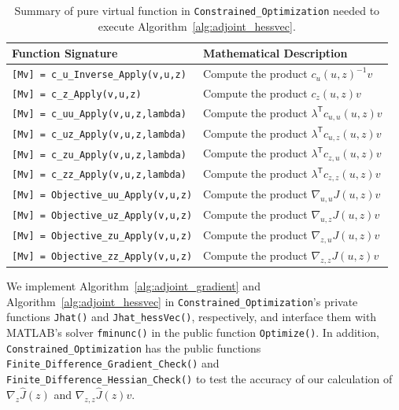 \documentclass{article}
\newcommand{\trp}{^{\mathsf{T}}}
\begin{document}
\begin{table}[!ht]
\centering
\begin{tabular}{|l|l|}
    \hline
    Function Signature & Mathematical Description
    \\ \hline
    \texttt{[Mv] = c\_u\_Inverse\_Apply(v,u,z)}
    & Compute the product $c_u(u,z)^{-1} v$
    \\
    \texttt{[Mv] = c\_z\_Apply(v,u,z)}
    & Compute the product $c_z(u,z) v$
    \\
    \texttt{[Mv] = c\_uu\_Apply(v,u,z,lambda)}
    & Compute the product $\lambda\trp c_{u,u}(u,z) v$
    \\
    \texttt{[Mv] = c\_uz\_Apply(v,u,z,lambda)}
    & Compute the product $\lambda\trp c_{u,z}(u,z) v$
    \\
    \texttt{[Mv] = c\_zu\_Apply(v,u,z,lambda)}
    & Compute the product $\lambda\trp c_{z,u}(u,z)v$
    \\
    \texttt{[Mv] = c\_zz\_Apply(v,u,z,lambda)}
    & Compute the product $\lambda\trp c_{z,z}(u,z) v$
    \\
    \texttt{[Mv] = Objective\_uu\_Apply(v,u,z)}
    & Compute the product $\nabla_{u,u} J(u,z) v$
    \\
    \texttt{[Mv] = Objective\_uz\_Apply(v,u,z)}
    & Compute the product $\nabla_{u,z} J(u,z) v$
    \\
    \texttt{[Mv] = Objective\_zu\_Apply(v,u,z)}
    & Compute the product $\nabla_{z,u} J(u,z) v$
    \\
    \texttt{[Mv] = Objective\_zz\_Apply(v,u,z)}
    & Compute the product $\nabla_{z,z} J(u,z) v$
    \\ \hline
\end{tabular}
\caption{Summary of pure virtual function in \texttt{Constrained\_Optimization} needed to execute Algorithm~\ref{alg:adjoint_hessvec}.}
\label{tab:con_opt_pure_virtual_funs_2}
\end{table}

We implement Algorithm~\ref{alg:adjoint_gradient} and Algorithm~\ref{alg:adjoint_hessvec} in \texttt{Constrained\_Optimization}'s private functions \texttt{Jhat()} and \texttt{Jhat\_hessVec()}, respectively,  and interface them with MATLAB's solver \texttt{fminunc()} in the public function \texttt{Optimize()}. In addition, \texttt{Constrained\_Optimization} has the public functions \\ \texttt{Finite\_Difference\_Gradient\_Check()} and \texttt{Finite\_Difference\_Hessian\_Check()} to test the accuracy of our calculation of $\nabla_z \hat{J}(z)$ and $\nabla_{z,z} \hat{J}(z)v$.
\end{document}
